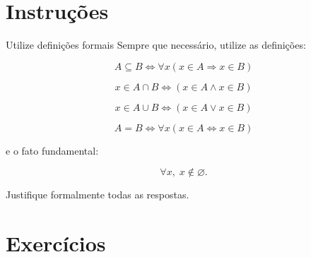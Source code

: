 \documentclass[12pt]{article}
\begin{document}
\vspace*{0.2cm}

\section*{Instruções}

\begin{block}{Utilize definições formais}
Sempre que necessário, utilize as definições:

\[
A \subseteq B \iff \forall x (x \in A \Rightarrow x \in B)
\]

\[
x \in A \cap B \iff (x \in A \land x \in B)
\]

\[
x \in A \cup B \iff (x \in A \lor x \in B)
\]

\[
A = B \iff \forall x (x \in A \Leftrightarrow x \in B)
\]

e o fato fundamental:

\[
\forall x,\; x \notin \varnothing.
\]
\end{block}

Justifique formalmente todas as respostas.

\section*{Exercícios}
\end{document}

